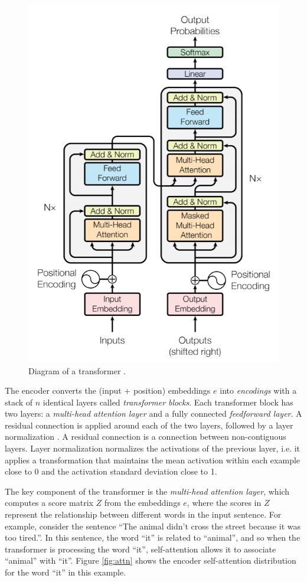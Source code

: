 
\begin{figure}[!h]
 \centering
 \includegraphics[width=0.5\columnwidth]{imgs/background/transformer.png}
 \caption{Diagram of a transformer \cite{vaswani2017attention}.}
 \label{fig:transformer}
\end{figure}

The encoder converts the (input + position) embeddings $e$ into \textit{encodings} with a stack of $n$ identical layers called \textit{transformer blocks}. Each transformer block has two layers: a \textit{multi-head attention layer} and a fully connected \textit{feedforward layer}. A residual connection \cite{he2016deep} is applied around each of the two layers, followed by a layer normalization \cite{ba2016layer}. A residual connection is a connection between non-contiguous layers. Layer normalization normalizes the activations of the previous layer, i.e. it applies a transformation that maintains the mean activation within each example close to 0 and the activation standard deviation close to 1.

The key component of the transformer is the \textit{multi-head attention layer}, which computes a score matrix $Z$ from the embeddings $e$, where the scores in $Z$ represent the relationship between different words in the input sentence. For example, consider the sentence ``The animal didn't cross the street because it was too tired.''. In this sentence, the word ``it'' is related to ``animal'', and so when the transformer is processing the word ``it'', self-attention allows it to associate ``animal'' with ``it''. Figure \ref{fig:attn} shows the encoder self-attention distribution for the word ``it'' in this example.

